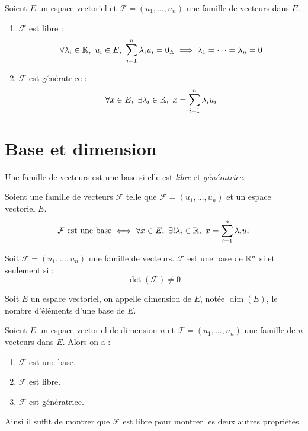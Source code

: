 \begin{definition}
	Soient $E$ un espace vectoriel et $\mathcal{F} = (u_1, \ldots, u_n)$ une famille de vecteurs dans $E$.
	\begin{enumerate}
		\item $\mathcal{F}$ est libre :
		\begin{align*}
			\forall \lambda_i \in \mathbb{K},\ u_i \in E,\ \sum_{i = 1}^n \lambda_i u_i = 0_E \implies \lambda_1 = \cdots = \lambda_n = 0
		\end{align*}
		\item $\mathcal{F}$ est génératrice :
		\begin{align*}
			\forall x \in E,\ \exists \lambda_i \in \mathbb{K},\ x = \sum_{i = 1}^n \lambda_i u_i 
		\end{align*}
	\end{enumerate}
\end{definition}

\section{Base et dimension}
\begin{definition}[Base]
	Une famille de vecteurs est une base si elle est \emph{libre} et \emph{génératrice}.
\end{definition}

\begin{proposition}
	Soient une famille de vecteurs $\mathcal{F}$ telle que $\mathcal{F} = (u_1, \ldots, u_n)$ et un espace vectoriel $E$.
	\[ 
	\mathcal{F} \text{ est une base} \iff 
	\forall x \in E,\ \exists ! \lambda_i \in \mathbb{R},\ x = \sum_{i = 1}^n \lambda_i u_i
	\]
\end{proposition}

\begin{proposition}
	Soit $\mathcal{F} = (u_1, \ldots, u_n)$ une famille de vecteurs. $\mathcal{F}$ est une base de $\mathbb{R}^n$ si et seulement si :
	\[ \det(\mathcal{F}) \neq 0 \]
\end{proposition}

\begin{definition}
	Soit $E$ un espace vectoriel, on appelle dimension de $E$, notée $\dim(E)$, le nombre d'éléments d'une base de $E$. 
\end{definition}


\begin{proposition}
	Soient $E$ un espace vectoriel de dimension $n$ et $\mathcal{F} = (u_1, \ldots, u_n)$ une famille de $n$ vecteurs dans $E$. Alors on a :
	\begin{multicols}{3}
	    \begin{enumerate}
		\item $\mathcal{F}$ est une base.
		\item $\mathcal{F}$ est libre.
		\item $\mathcal{F}$ est génératrice.
	\end{enumerate}
	\end{multicols}
	\noindent Ainsi il suffit de montrer que $\mathcal{F}$ est libre pour montrer les deux autres propriétés.
\end{proposition}

